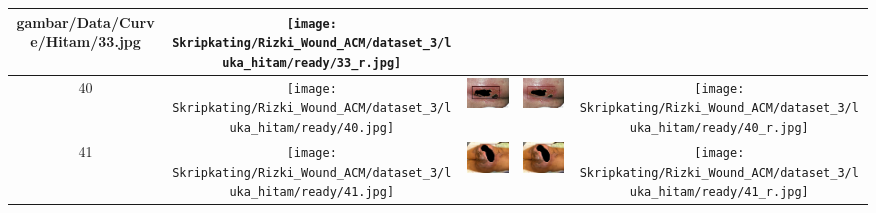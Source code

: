 \begin{longtable}[width = 8cm]{| c | c | c | c | c |}
    {gambar/Data/Curve/Hitam/33.jpg} &
    \texttt{[image: Skripkating/Rizki\_Wound\_ACM/dataset\_3/luka\_hitam/ready/33\_r.jpg]}
	\\
	\hline
	40 &
    \texttt{[image: Skripkating/Rizki\_Wound\_ACM/dataset\_3/luka\_hitam/ready/40.jpg]} &
    \includegraphics[keepaspectratio, width=2cm]
    {gambar/Data/BorderFollowing/Hitam/40.jpg} &
    \includegraphics[keepaspectratio, width=2cm]
    {gambar/Data/Curve/Hitam/40.jpg} &
    \texttt{[image: Skripkating/Rizki\_Wound\_ACM/dataset\_3/luka\_hitam/ready/40\_r.jpg]}
	\\
	\hline
	41 &
    \texttt{[image: Skripkating/Rizki\_Wound\_ACM/dataset\_3/luka\_hitam/ready/41.jpg]} &
    \includegraphics[keepaspectratio, width=2cm]
    {gambar/Data/BorderFollowing/Hitam/41.jpg} &
    \includegraphics[keepaspectratio, width=2cm]
    {gambar/Data/Curve/Hitam/41.jpg} &
    \texttt{[image: Skripkating/Rizki\_Wound\_ACM/dataset\_3/luka\_hitam/ready/41\_r.jpg]}
	\\
	\hline
\end{longtable}
